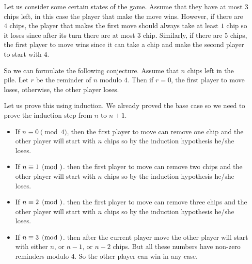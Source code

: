 Let us consider some certain states of the game.
Assume that they have at most $3$ chips left, in this case the player that make
the move wins. However, if there are $4$ chips, the
player that makes the first move should always take at least $1$ chip so it
loses since after its turn there are at most $3$ chip. Similarly, if there
are $5$ chips, the first player to move wins since it can take a chip and
make the second player to start with $4$.

So we can formulate the following conjecture.
Assume that $n$ chips left in the pile. Let $r$ be the reminder of $n$ modulo
$4$. Then if $r = 0$, the first player to move loses, otherwise, the other
player loses.

Let us prove this using induction. We already proved the base case so
we need to prove the induction step from $n$ to $n + 1$.
\begin{itemize}
  \item If $n \equiv 0 \pmod{4}$, then the first player to move can remove one
    chip and the other player will start with $n$ chips so by the induction
    hypothesis he/she loses.
  \item If $n \equiv 1 \pmod$. then the first player to move can remove two
    chips and the other player will start with $n$ chips so by the induction
    hypothesis he/she loses.
  \item If $n \equiv 2 \pmod$. then the first player to move can remove three
    chips and the other player will start with $n$ chips so by the induction
    hypothesis he/she loses.
  \item If $n \equiv 3 \pmod$. then after the current player move the other
    player will start with either $n$, or $n - 1$, or $n - 2$ chips. But all
    these numbers have non-zero reminders modulo $4$. So the other player
    can win in any case.
\end{itemize}

